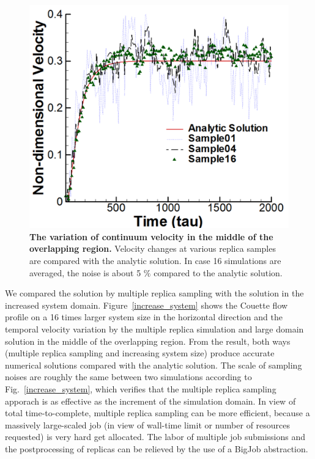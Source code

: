 \documentclass[preprint,12pt]{elsarticle}
\begin{document}
\begin{figure}
\centering
\includegraphics[width=0.6\linewidth]{Couette_025_Temporal_Multiset.pdf}
\vskip-0.2cm
\caption{\small {\bf The variation of continuum velocity in the middle of the overlapping region.}
Velocity changes at various replica samples are compared with the analytic
solution. In case 16 simulations are averaged, the noise is about 5 $\%$
compared to the analytic solution.}
\label{multiple_couette_temporal}
\end{figure}


We compared the solution by multiple replica sampling with the solution in the increased system domain. Figure~\ref{increase_system} shows the Couette flow profile on a 16 times larger system size in the horizontal direction and the temporal velocity variation by the multiple replica simulation and large domain solution in the middle of the overlapping region. From the result, both ways (multiple replica sampling and increasing system size) produce accurate numerical solutions compared with the analytic solution. The scale of sampling noises are roughly the same between two simulations according to Fig.~\ref{increase_system}, which verifies that the multiple replica sampling apporach is as effective as the increment of the simulation domain. In view of total time-to-complete, multiple replica sampling can be more efficient, because a massively large-scaled job (in view of wall-time limit or number of resources requested) is very hard get allocated. The labor of multiple job submissions and the postprocessing of replicas can be relieved by the use of a BigJob abstraction.
\end{document}
